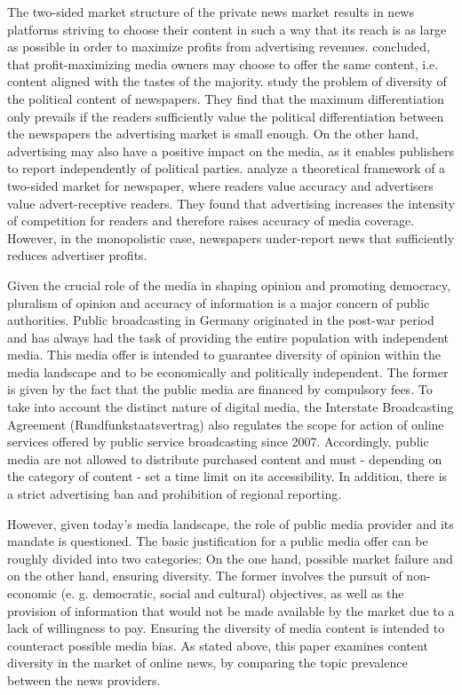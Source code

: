 \documentclass[12pt,a4paper,notitlepage]{article}
\begin{document}
The two-sided market structure of the private news market results in news platforms striving to choose their content in such a way that its reach is as large as possible in order to maximize profits from advertising revenues. \citet{steiner_program_1952} concluded, that profit-maximizing media owners may choose to offer the same content, i.e. content aligned with the tastes of the majority. \citep{gabszewicz_press_2001} study the problem of diversity of the political content of newspapers. They find that the maximum differentiation only prevails if the readers sufficiently value the political differentiation between the newspapers the advertising market is small enough. On the other hand, advertising may also have a positive impact on the media, as it enables publishers to report independently of political parties. \citet{ellman_what_2009} analyze a theoretical framework of a two-sided market for newspaper, where readers value accuracy and advertisers value advert-receptive readers. They found that advertising increases the intensity of competition for readers and therefore raises accuracy of media coverage. However, in the monopolistic case, newspapers under-report news that sufficiently reduces advertiser profits. 

Given the crucial role of the media in shaping opinion and promoting democracy, pluralism of opinion and accuracy of information is a major concern of public authorities. Public broadcasting in Germany originated in the post-war period and has always had the task of providing the entire population with independent media. This media offer is intended to guarantee diversity of opinion within the media landscape and to be economically and politically independent. The former is given by the fact that the public media are financed by compulsory fees. To take into account the distinct nature of digital media, the Interstate Broadcasting Agreement (Rundfunkstaatsvertrag) also regulates the scope for action of online services offered by public service broadcasting since 2007. Accordingly, public media are not allowed to distribute purchased content and must - depending on the category of content - set a time limit on its accessibility. In addition, there is a strict advertising ban and prohibition of regional reporting. 

However, given today's media landscape, the role of public media provider and its mandate is questioned. The basic justification for a public media offer can be roughly divided into two categories: On the one hand, possible market failure and on the other hand, ensuring diversity. The former involves the pursuit of non-economic (e. g. democratic, social and cultural) objectives, as well as the provision of information that would not be made available by the market due to a lack of willingness to pay. Ensuring the diversity of media content is intended to counteract possible media bias. As stated above, this paper examines content diversity in the market of online news, by comparing the topic prevalence between the news providers. 
\end{document}

